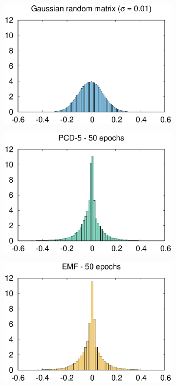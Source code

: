 \documentclass{revtex4-1}
\begin{document}
\begin{figure}
  \centering
  \begin{subfigure}{.25\linewidth}
    \includegraphics[width=\linewidth]{w_init.eps}
    \caption{}
    \label{fig:w_init}
  \end{subfigure}
  \begin{subfigure}{.25\linewidth}
    \includegraphics[width=\linewidth]{w_pcd5_50.eps}
    \caption{}
    \label{fig:w_pcd5_50}
  \end{subfigure}
  \begin{subfigure}{.25\linewidth}
    \includegraphics[width=\linewidth]{w_tap20_50.eps}

\end{subfigure}
\end{figure}
\end{document}
